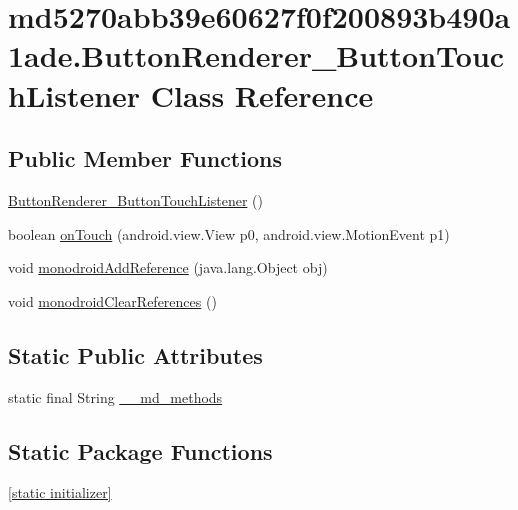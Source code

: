 \hypertarget{classmd5270abb39e60627f0f200893b490a1ade_1_1_button_renderer___button_touch_listener}{
\section{md5270abb39e60627f0f200893b490a1ade.ButtonRenderer\_\-ButtonTouchListener Class Reference}
\label{classmd5270abb39e60627f0f200893b490a1ade_1_1_button_renderer___button_touch_listener}
}
\subsection*{Public Member Functions}
\begin{CompactItemize}
\item 
\hyperlink{classmd5270abb39e60627f0f200893b490a1ade_1_1_button_renderer___button_touch_listener_dd0dff031ed4ad0bfd0aca3742dd9cd7}{ButtonRenderer\_\-ButtonTouchListener} ()
\item 
boolean \hyperlink{classmd5270abb39e60627f0f200893b490a1ade_1_1_button_renderer___button_touch_listener_698aef31ea103a2c7ad4461c6ce0ce98}{onTouch} (android.view.View p0, android.view.MotionEvent p1)
\item 
void \hyperlink{classmd5270abb39e60627f0f200893b490a1ade_1_1_button_renderer___button_touch_listener_8a4f78c3f205a47efb743b43d0d239b9}{monodroidAddReference} (java.lang.Object obj)
\item 
void \hyperlink{classmd5270abb39e60627f0f200893b490a1ade_1_1_button_renderer___button_touch_listener_bbf99eca09ba5a4f75e2cb5536fcfddc}{monodroidClearReferences} ()
\end{CompactItemize}
\subsection*{Static Public Attributes}
\begin{CompactItemize}
\item 
static final String \hyperlink{classmd5270abb39e60627f0f200893b490a1ade_1_1_button_renderer___button_touch_listener_ea3b2556e7fa58d1abea18bfdd03b8c5}{\_\-\_\-md\_\-methods}
\end{CompactItemize}
\subsection*{Static Package Functions}
\begin{CompactItemize}
\item 
\hyperlink{classmd5270abb39e60627f0f200893b490a1ade_1_1_button_renderer___button_touch_listener_da129c2f59932d8277c4193af1356ea1}{\mbox{[}static initializer\mbox{]}}
\end{CompactItemize}
